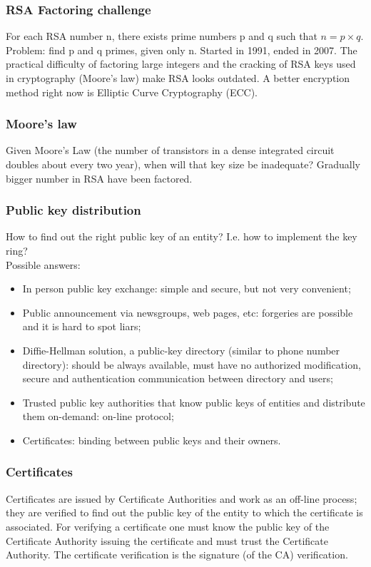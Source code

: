 \documentclass[a4paper, 10pt, titlepage]{article}
\begin{document}
\subsubsection*{RSA Factoring challenge}
For each RSA number n, there exists prime numbers p and q such that $n = p \times q$. Problem: find p and q primes, given only n.
Started in 1991, ended in 2007. The practical difficulty of factoring large integers and the cracking of RSA keys used in cryptography (Moore's law) make RSA looks outdated. A better encryption method right now is Elliptic Curve Cryptography (ECC).

\subsubsection{Moore's law}
Given Moore’s Law (the number of transistors in a dense integrated circuit doubles about every two year), when will that key size be inadequate? Gradually bigger number in RSA have been factored.

\subsubsection{Public key distribution}
How to find out the right public key of an entity? I.e. how to implement the key ring?\\
Possible answers:
\begin{itemize}
\item In person public key exchange: simple and secure, but not very convenient;
\item Public announcement via newsgroups, web pages, etc: forgeries are possible and it is hard to spot liars;
\item Diffie-Hellman solution, a public-key directory (similar to phone number directory): should be always available, must have no authorized modification, secure and authentication communication between directory and users;
\item Trusted public key authorities that know public keys of entities and distribute them on-demand: on-line protocol;
\item Certificates: binding between public keys and their owners.
\end{itemize}

\subsubsection{Certificates}
Certificates are issued by Certificate Authorities and work as an off-line process; they are verified to find out the public key of the entity to which the certificate is associated. For verifying a certificate one must know the public key of the Certificate Authority issuing the certificate and must trust the Certificate Authority.
The certificate verification is the signature (of the CA) verification. 
\end{document}
